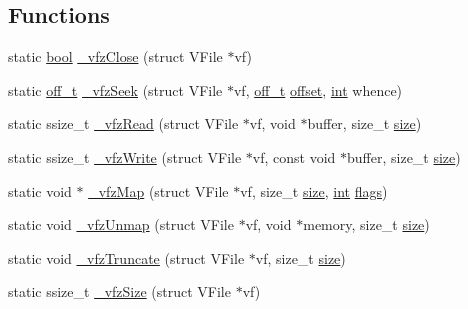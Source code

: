 \subsection*{Functions}
\begin{DoxyCompactItemize}
\item 
static \mbox{\hyperlink{libretro_8h_a4a26dcae73fb7e1528214a068aca317e}{bool}} \mbox{\hyperlink{vfs-zip_8c_a9984b3be64824e3b860d6fcb2ce2a2a3}{\+\_\+vfz\+Close}} (struct V\+File $\ast$vf)
\item 
static \mbox{\hyperlink{__builder_8h_a53066be3c3a28d8b8ccb3dc95c1e49b1}{off\+\_\+t}} \mbox{\hyperlink{vfs-zip_8c_a84d781da640055a7334040e6cde4dea2}{\+\_\+vfz\+Seek}} (struct V\+File $\ast$vf, \mbox{\hyperlink{__builder_8h_a53066be3c3a28d8b8ccb3dc95c1e49b1}{off\+\_\+t}} \mbox{\hyperlink{ioapi_8h_a601c4660e8a1a14a1b87fe387e934d19}{offset}}, \mbox{\hyperlink{ioapi_8h_a787fa3cf048117ba7123753c1e74fcd6}{int}} whence)
\item 
static ssize\+\_\+t \mbox{\hyperlink{vfs-zip_8c_a593e9a250e3d7aa9c3b94a1f7b9a8cca}{\+\_\+vfz\+Read}} (struct V\+File $\ast$vf, void $\ast$buffer, size\+\_\+t \mbox{\hyperlink{ioapi_8h_a014d89bd76f74ef3a29c8f04b473eb76}{size}})
\item 
static ssize\+\_\+t \mbox{\hyperlink{vfs-zip_8c_aa2e7a8e1946bc438fc2cd474533b9e56}{\+\_\+vfz\+Write}} (struct V\+File $\ast$vf, const void $\ast$buffer, size\+\_\+t \mbox{\hyperlink{ioapi_8h_a014d89bd76f74ef3a29c8f04b473eb76}{size}})
\item 
static void $\ast$ \mbox{\hyperlink{vfs-zip_8c_a2569d7414fd035ae883a93e401f2deee}{\+\_\+vfz\+Map}} (struct V\+File $\ast$vf, size\+\_\+t \mbox{\hyperlink{ioapi_8h_a014d89bd76f74ef3a29c8f04b473eb76}{size}}, \mbox{\hyperlink{ioapi_8h_a787fa3cf048117ba7123753c1e74fcd6}{int}} \mbox{\hyperlink{lr35902_2decoder_8c_a11f29eea941556f0630cfd3285f565c0}{flags}})
\item 
static void \mbox{\hyperlink{vfs-zip_8c_a5a60c5c59fcbcaaa9d72998904f495a0}{\+\_\+vfz\+Unmap}} (struct V\+File $\ast$vf, void $\ast$memory, size\+\_\+t \mbox{\hyperlink{ioapi_8h_a014d89bd76f74ef3a29c8f04b473eb76}{size}})
\item 
static void \mbox{\hyperlink{vfs-zip_8c_a2e1b60c1a45619a164b0d2adea1969da}{\+\_\+vfz\+Truncate}} (struct V\+File $\ast$vf, size\+\_\+t \mbox{\hyperlink{ioapi_8h_a014d89bd76f74ef3a29c8f04b473eb76}{size}})
\item 
static ssize\+\_\+t \mbox{\hyperlink{vfs-zip_8c_a731254500de7ab9fe9d441dbe8467f77}{\+\_\+vfz\+Size}} (struct V\+File $\ast$vf)
\item 

\end{DoxyCompactItemize}

